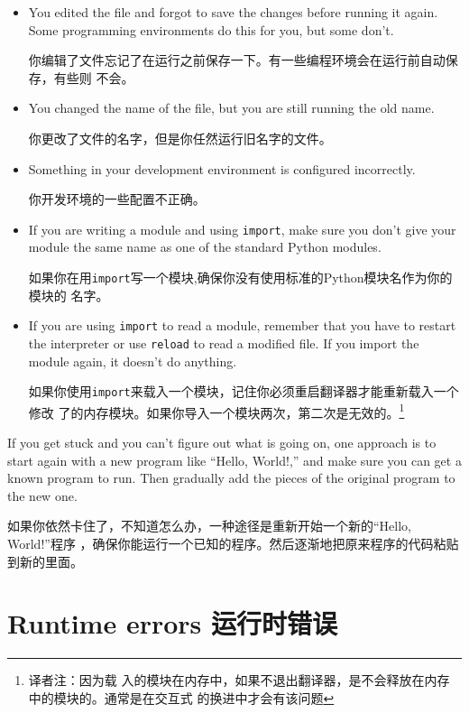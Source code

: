 \documentclass[10pt]{book}
\begin{document}
\begin{CJK}{UTF8}{gbsn}
\begin{itemize}

\item You edited the file and forgot to save the changes before
running it again.  Some programming environments do this
for you, but some don't.

你编辑了文件忘记了在运行之前保存一下。有一些编程环境会在运行前自动保存，有些则
不会。

\item You changed the name of the file, but you are still running
the old name.

你更改了文件的名字，但是你任然运行旧名字的文件。

\item Something in your development environment is configured
incorrectly.

你开发环境的一些配置不正确。

\item If you are writing a module and using {\tt import},
make sure you don't give your module the same name as one
of the standard Python modules.

如果你在用{\tt import}写一个模块,确保你没有使用标准的Python模块名作为你的模块的
名字。

\item If you are using {\tt import} to read a module, remember
that you have to restart the interpreter or use {\tt reload}
to read a modified file.  If you import the module again, it
doesn't do anything.

如果你使用{\tt import}来载入一个模块，记住你必须重启翻译器才能重新载入一个修改
了的内存模块。如果你导入一个模块两次，第二次是无效的。\footnote{译者注：因为载
入的模块在内存中，如果不退出翻译器，是不会释放在内存中的模块的。通常是在交互式
的换进中才会有该问题}

\end{itemize}

If you get stuck and you can't figure out what is going on, one
approach is to start again with a new program like ``Hello, World!,''
and make sure you can get a known program to run.  Then gradually add
the pieces of the original program to the new one.

如果你依然卡住了，不知道怎么办，一种途径是重新开始一个新的``Hello, World!''程序
，确保你能运行一个已知的程序。然后逐渐地把原来程序的代码粘贴到新的里面。

\section{Runtime errors 运行时错误}


\end{CJK}
\end{document}
